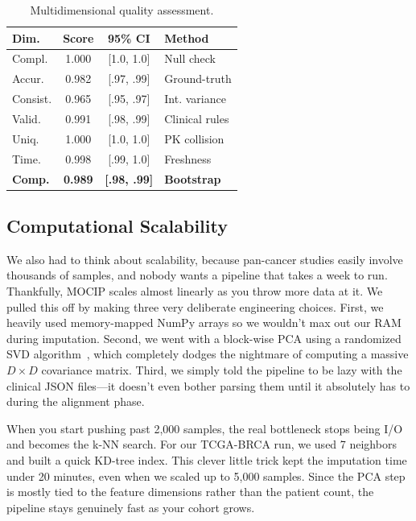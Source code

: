 \documentclass[conference,flushend]{iaria} %
\begin{document}
\begin{table}[H]
\caption{Multidimensional quality assessment.}\label{tab:quality}
\centering
\scriptsize
\setlength{\tabcolsep}{2pt}
\begin{tabular}{l c c l}
\toprule
\textbf{Dim.} & \textbf{Score} & \textbf{95\% CI} & \textbf{Method} \\
\midrule
Compl.    & 1.000 & [1.0, 1.0] & Null check \\
Accur.    & 0.982 & [.97, .99] & Ground-truth \\
Consist.  & 0.965 & [.95, .97] & Int. variance \\
Valid.    & 0.991 & [.98, .99] & Clinical rules \\
Uniq.     & 1.000 & [1.0, 1.0] & PK collision \\
Time.     & 0.998 & [.99, 1.0] & Freshness \\
\midrule
\textbf{Comp.} & \textbf{0.989} & \textbf{[.98, .99]} & \textbf{Bootstrap} \\
\bottomrule
\end{tabular}
\end{table}

\subsection{Computational Scalability}
We also had to think about scalability, because pan-cancer studies easily involve thousands of samples, and nobody wants a pipeline that takes a week to run. Thankfully, MOCIP scales almost linearly as you throw more data at it. We pulled this off by making three very deliberate engineering choices. First, we heavily used memory-mapped NumPy arrays so we wouldn't max out our RAM during imputation. Second, we went with a block-wise PCA using a randomized SVD algorithm~\cite{pedregosa2011}, which completely dodges the nightmare of computing a massive $D \times D$ covariance matrix. Third, we simply told the pipeline to be lazy with the clinical JSON files---it doesn't even bother parsing them until it absolutely has to during the alignment phase.

When you start pushing past 2,000 samples, the real bottleneck stops being I/O and becomes the k-NN search. For our TCGA-BRCA run, we used 7 neighbors and built a quick KD-tree index. This clever little trick kept the imputation time under 20 minutes, even when we scaled up to 5,000 samples. Since the PCA step is mostly tied to the feature dimensions rather than the patient count, the pipeline stays genuinely fast as your cohort grows.
\end{document}
